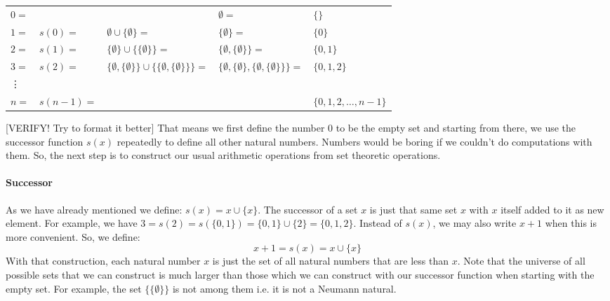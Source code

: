 \medskip
\begin{tabular}{l l l l l}
$0=$ &         & 
               & $\emptyset =$                                               
               & $ \{ \} $                                         \\
$1=$ & $s(0)=$ & $\emptyset \cup \{ \emptyset \} =$             
               & $ \{ \emptyset \} =$ 
               & $ \{ 0 \}$                                         \\
$2=$ & $s(1)=$ & $ \{ \emptyset \} \cup \{  \{ \emptyset \} \}=$ 
               & $ \{\emptyset,  \{ \emptyset \} \} =$       
               & $ \{ 0,  1 \} $                                    \\
$3=$ & $s(2)=$ & $\{\emptyset,  \{ \emptyset \} \} \cup \{  \{\emptyset,  \{ \emptyset \} \} \}=$ 
               & $ \{\emptyset,  \{ \emptyset \},  \{\emptyset,  \{ \emptyset \} \} \} =$       
               & $ \{ 0, 1, 2 \} $                                    \\   
\vdots \\
$n=$ & $s(n-1)=$  & & & $\{ 0, 1, 2, \ldots, n-1 \} $       
\end{tabular}
\medskip

[VERIFY! Try to format it better] That means we first define the number $0$ to be the empty set and starting from there, we use the successor function $s(x)$ repeatedly to define all other natural numbers. Numbers would be boring if we couldn't do computations with them. So, the next step is to construct our usual arithmetic operations from set theoretic operations.


\paragraph{Successor}
As we have already mentioned we define: $s(x) = x \cup \{x\}$. The successor of a set $x$ is just that same set $x$ with $x$ itself added to it as new element. For example, we have $3 = s(2) = s(\{0,1\}) = \{0,1\} \cup \{2\} = \{0,1,2\}$. Instead of $s(x)$, we may also write $x+1$ when this is more convenient. So, we define:
\begin{equation}
x + 1 = s(x) = x \cup \{x\}
\end{equation}
With that construction, each natural number $x$ is just the set of all natural numbers that are less than $x$. Note that the universe of all possible sets that we can construct is much larger than those which we can construct with our successor function when starting with the empty set. For example, the set $\{\{\emptyset\}\}$ is not among them i.e. it is not a Neumann natural.


